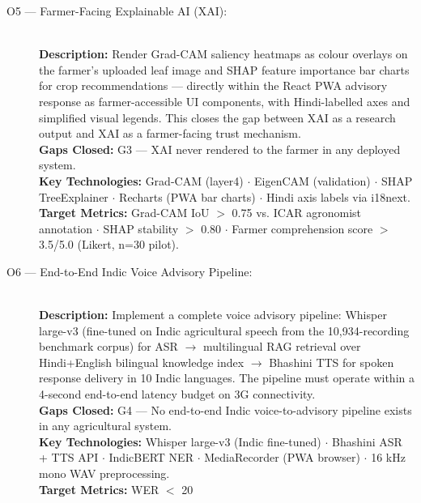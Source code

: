 \documentclass[12pt,a4paper]{article}
\begin{document}
\begin{description}
    \item[O5 --- Farmer-Facing Explainable AI (XAI):] \hfill \\
    \textbf{Description:} Render Grad-CAM saliency heatmaps as colour overlays on the farmer's uploaded leaf image and SHAP feature importance bar charts for crop recommendations --- directly within the React PWA advisory response as farmer-accessible UI components, with Hindi-labelled axes and simplified visual legends. This closes the gap between XAI as a research output and XAI as a farmer-facing trust mechanism. \\
    \textbf{Gaps Closed:} G3 --- XAI never rendered to the farmer in any deployed system. \\
    \textbf{Key Technologies:} Grad-CAM (layer4) $\cdot$ EigenCAM (validation) $\cdot$ SHAP TreeExplainer $\cdot$ Recharts (PWA bar charts) $\cdot$ Hindi axis labels via i18next. \\
    \textbf{Target Metrics:} Grad-CAM IoU $>$ 0.75 vs. ICAR agronomist annotation $\cdot$ SHAP stability $>$ 0.80 $\cdot$ Farmer comprehension score $>$ 3.5/5.0 (Likert, n=30 pilot).

    \item[O6 --- End-to-End Indic Voice Advisory Pipeline:] \hfill \\
    \textbf{Description:} Implement a complete voice advisory pipeline: Whisper large-v3 (fine-tuned on Indic agricultural speech from the 10,934-recording benchmark corpus) for ASR $\to$ multilingual RAG retrieval over Hindi+English bilingual knowledge index $\to$ Bhashini TTS for spoken response delivery in 10 Indic languages. The pipeline must operate within a 4-second end-to-end latency budget on 3G connectivity. \\
    \textbf{Gaps Closed:} G4 --- No end-to-end Indic voice-to-advisory pipeline exists in any agricultural system. \\
    \textbf{Key Technologies:} Whisper large-v3 (Indic fine-tuned) $\cdot$ Bhashini ASR + TTS API $\cdot$ IndicBERT NER $\cdot$ MediaRecorder (PWA browser) $\cdot$ 16 kHz mono WAV preprocessing. \\
    \textbf{Target Metrics:} WER $<$ 20%


\end{description}
\end{document}
